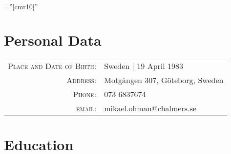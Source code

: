 \documentclass[a4paper,10pt]{article} %
\begin{document}
\pagestyle{empty} %

\font\fb=''[cmr10]'' %


\par{\bigskip\par} %

\section{Personal Data}

\begin{tabular}{rl}
\textsc{Place and Date of Birth:} & Sweden  | 19 April 1983 \\
\textsc{Address:} & Motgången 307, Göteborg, Sweden \\
\textsc{Phone:} & 073 6837674\\
\textsc{email:} & \href{mailto:mikael.ohman@chalmers.se}{mikael.ohman@chalmers.se}
\end{tabular}


\section{Education}
\end{document}
